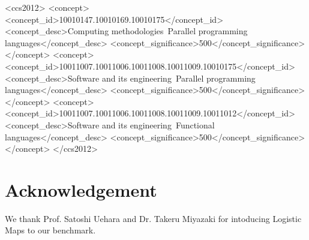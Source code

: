 \documentclass[sigplan,table]{acmart}
\begin{document}
%
%
\begin{CCSXML}
<ccs2012>
<concept>
<concept_id>10010147.10010169.10010175</concept_id>
<concept_desc>Computing methodologies~Parallel programming languages</concept_desc>
<concept_significance>500</concept_significance>
</concept>
<concept>
<concept_id>10011007.10011006.10011008.10011009.10010175</concept_id>
<concept_desc>Software and its engineering~Parallel programming languages</concept_desc>
<concept_significance>500</concept_significance>
</concept>
<concept>
<concept_id>10011007.10011006.10011008.10011009.10011012</concept_id>
<concept_desc>Software and its engineering~Functional languages</concept_desc>
<concept_significance>500</concept_significance>
</concept>
</ccs2012>
\end{CCSXML}




\maketitle



\section*{Acknowledgement}

We thank Prof. Satoshi Uehara and Dr. Takeru Miyazaki for intoducing Logistic Maps \cite{Miyazaki14} to our benchmark.



\end{document}
